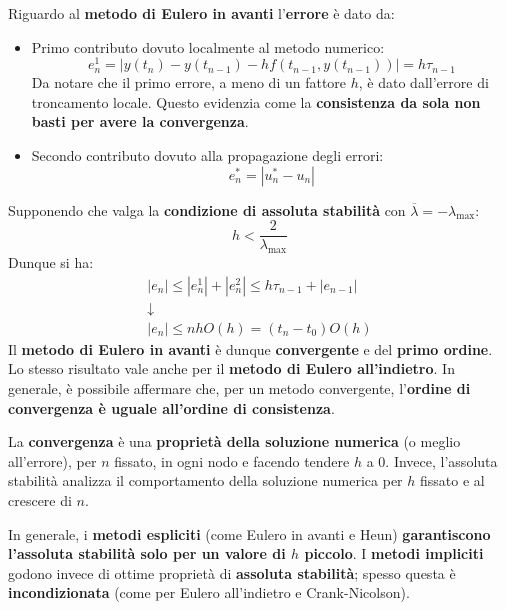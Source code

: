 \noindent
Riguardo al \textbf{metodo di Eulero in avanti} l'\textbf{errore} è dato da:
\begin{itemize}
	\item Primo contributo dovuto localmente al metodo numerico:
	\begin{equation}
		e_{n}^{1} = \left|y\left(t_{n}\right) - y\left(t_{n-1}\right) - hf\left(t_{n-1}, y\left(t_{n-1}\right)\right)\right| = h\tau_{n-1}
	\end{equation}
	Da notare che il primo errore, a meno di un fattore $h$, è dato dall'errore di troncamento locale. Questo evidenzia come la \textbf{consistenza da sola non basti per avere la convergenza}.
	
	\item Secondo contributo dovuto alla propagazione degli errori:
	\begin{equation}
		e_{n}^{*} = \left|u_{n}^{*} - u_{n}\right|
	\end{equation}
\end{itemize}
Supponendo che valga la \textbf{condizione di assoluta stabilità} con $\overline{\lambda} = -\lambda_{\max}$:
\begin{equation*}
	h < \dfrac{2}{\lambda_{\max}}
\end{equation*}
Dunque si ha:
\begin{equation}
	\begin{array}{c}
		\left|e_{n}\right| \le \left|e_{n}^{1}\right| + \left|e_{n}^{2}\right| \le h\tau_{n-1} + \left|e_{n-1}\right| \\ [.5em]
		\downarrow \\ [.5em]
		\left|e_{n}\right| \le n h O\left(h\right) = \left(t_{n} - t_{0}\right)O\left(h\right)
	\end{array}
\end{equation}
Il \textbf{metodo di Eulero in avanti} è dunque \textbf{convergente} e del \textbf{primo ordine}. Lo stesso risultato vale anche per il \textbf{metodo di Eulero all'indietro}. In generale, è possibile affermare che, per un metodo convergente, l'\textbf{ordine di convergenza è uguale all'ordine di consistenza}.

\highspace
La \textbf{convergenza} è una \textbf{proprietà della soluzione numerica} (o meglio all'errore), per $n$ fissato, in ogni nodo e facendo tendere $h$ a $0$. Invece, l'assoluta stabilità analizza il comportamento della soluzione numerica per $h$ fissato e al crescere di $n$.

\highspace
In generale, i \textbf{metodi espliciti} (come Eulero in avanti e Heun) \textbf{garantiscono l'assoluta stabilità solo per un valore di $h$ piccolo}. I \textbf{metodi impliciti} godono invece di ottime proprietà di \textbf{assoluta stabilità}; spesso questa è \textbf{incondizionata} (come per Eulero all'indietro e Crank-Nicolson). 